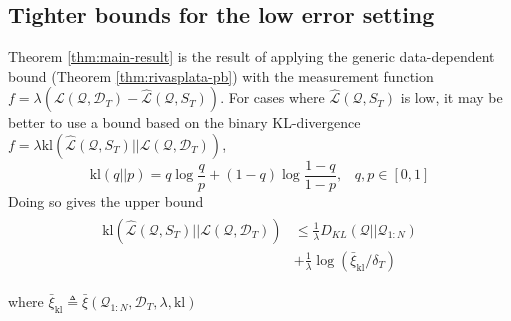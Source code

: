 \documentclass[letterpaper]{article} %
\theoremstyle{definition}
\newtheorem{lemma}[theorem]{Lemma}
\newcommand{\RM}[1]{\textcolor{magenta}{\{RM: #1\}}}
\begin{document}

\subsection{Tighter bounds for the low error setting}

Theorem \ref{thm:main-result} is the result of applying the generic data-dependent bound (Theorem \ref{thm:rivasplata-pb}) with the measurement function $f=\lambda(\mathcal{L}(\mathcal{Q},\mathcal{D}_T)-\hat{\mathcal{L}}(\mathcal{Q}, S_T))$. For cases where $\hat{\mathcal{L}}(\mathcal{Q}, S_T)$ is low, it may be better to use a bound based on the binary KL-divergence $f=\lambda \mathrm{kl}(\hat{\mathcal{L}}(\mathcal{Q}, S_T)||\mathcal{L}(\mathcal{Q},\mathcal{D}_T))$, 
$$
\mathrm{kl}(q||p)=q \log\frac{q}{p}+(1-q)\log\frac{1-q}{1-p},\;\;\; q,p\in[0, 1]
$$
Doing so gives the upper bound
    \begin{align} \label{eq:generic-kl-bound}
\begin{split}
\mathrm{kl}(\hat{\mathcal{L}}(\mathcal{Q}, S_T)||\mathcal{L}(\mathcal{Q},\mathcal{D}_T)) &\leq \frac{1}{\lambda} D_{KL}(\mathcal{Q}||\mathcal{Q}_{1:N})\\
&+\frac{1}{\lambda}\log\left (\bar{\xi}_{\mathrm{kl}}/\delta_T\right ) 
\end{split}
\end{align}

where $\bar{\xi}_{\mathrm{kl}}\triangleq \bar{\xi}(\mathcal{Q}_{1:N}, \mathcal{D}_T,\lambda, \mathrm{kl}) $

%

\end{document}
